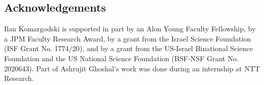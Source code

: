 \subsection*{Acknowledgements} 
Ilan Komargodski is supported in part by an Alon Young Faculty Fellowship, by a JPM Faculty Research Award, by a grant from the Israel Science Foundation (ISF Grant No. 1774/20), and by a grant from the US-Israel Binational Science Foundation and the US National Science Foundation (BSF-NSF Grant No. 2020643). Part of Ashrujit Ghoshal's work was done during an internship at NTT Research.